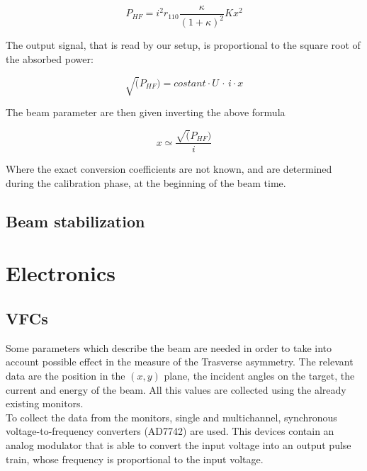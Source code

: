 \begin{equation}
P_{HF} = i^{2} r_{110} \frac{\kappa}{(1 + \kappa)^{2}} K x^{2}
\end{equation} 
 
The output signal, that is read by our setup, is proportional to the square root of the absorbed power:

\begin{equation}
\sqrt(P_{HF}) = costant \cdot U \, \cdot \, i   \cdot x
\end{equation} 

The beam parameter are then given inverting the above formula 

\begin{equation} \label{eq:SignalToVfc}
x \simeq \frac{\sqrt(P_{HF})}{i}
\end{equation}

Where the exact conversion coefficients are not known, and are determined during the calibration phase, at the beginning of the beam time.

\subsection{Beam stabilization}

\section{Electronics}


\subsection{VFCs}

Some parameters which describe the beam are needed in order to take into account possible effect in the measure of the Trasverse asymmetry. The relevant data are the position in the $(x,y)$ plane, the incident angles on the target, the current and energy of the beam. All this values are collected using the already existing monitors. \\
To collect the data from the monitors, single and multichannel, synchronous voltage-to-frequency converters (AD7742) are used. This devices contain an analog modulator that is able to convert the input voltage into an output pulse train, whose frequency is proportional to the input voltage. 

